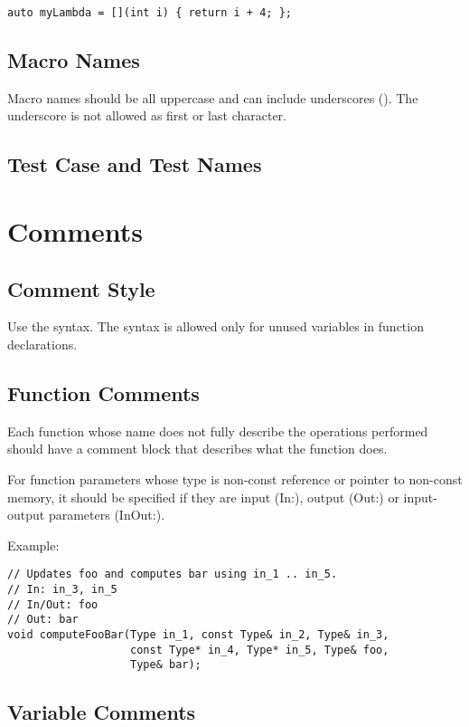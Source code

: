 \begin{lstlisting}[showspaces=false]
auto myLambda = [](int i) { return i + 4; };
\end{lstlisting}

\subsection{Macro Names}

Macro names should be all uppercase and can include underscores (\inlinecode{_}).
The underscore is not allowed as first or last character.

\subsection{Test Case and Test Names}

\section{Comments}

\subsection{Comment Style}

Use the  syntax.
The  syntax is allowed only for unused variables in function declarations.

\subsection{Function Comments}

Each function whose name does not fully describe the operations performed should have a comment block that describes what the function does.

For function parameters whose type is non-const reference or pointer to non-const memory,
it should be specified if they are input (In:), output (Out:) or input-output parameters (InOut:).

Example:
\begin{lstlisting}
// Updates foo and computes bar using in_1 .. in_5.
// In: in_3, in_5
// In/Out: foo
// Out: bar
void computeFooBar(Type in_1, const Type& in_2, Type& in_3,
                   const Type* in_4, Type* in_5, Type& foo,
                   Type& bar);
\end{lstlisting}

\subsection{Variable Comments}


